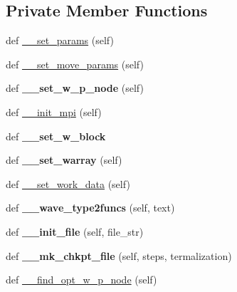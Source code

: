 \subsection*{Private Member Functions}
\begin{DoxyCompactItemize}
\item 
def \hyperlink{classMontePython_1_1MontePython_abb0b8bcdbf58fa657c24052f045241e0}{\+\_\+\+\_\+set\+\_\+params} (self)
\item 
def \hyperlink{classMontePython_1_1MontePython_ae75ee5aa95caacffb3c22a64346f93d8}{\+\_\+\+\_\+set\+\_\+move\+\_\+params} (self)
\item 
\hypertarget{classMontePython_1_1MontePython_a744df5118714b5f3c7045f3c3b006b64}{}def {\bfseries \+\_\+\+\_\+set\+\_\+w\+\_\+p\+\_\+node} (self)\label{classMontePython_1_1MontePython_a744df5118714b5f3c7045f3c3b006b64}

\item 
def \hyperlink{classMontePython_1_1MontePython_a0138e484a9562de2681bf405b6b116b2}{\+\_\+\+\_\+init\+\_\+mpi} (self)
\item 
\hypertarget{classMontePython_1_1MontePython_aac273222b8e9e6267d656dccc78c1423}{}def {\bfseries \+\_\+\+\_\+set\+\_\+w\+\_\+block}\label{classMontePython_1_1MontePython_aac273222b8e9e6267d656dccc78c1423}

\item 
\hypertarget{classMontePython_1_1MontePython_a513762297492e12bcfa0d35c62ee080a}{}def {\bfseries \+\_\+\+\_\+set\+\_\+warray} (self)\label{classMontePython_1_1MontePython_a513762297492e12bcfa0d35c62ee080a}

\item 
def \hyperlink{classMontePython_1_1MontePython_ae1bd1bcab91678638894f3a2630b9ed1}{\+\_\+\+\_\+set\+\_\+work\+\_\+data} (self)
\item 
\hypertarget{classMontePython_1_1MontePython_aa3b29cc6ffadd601aa9a85ca43cdbd21}{}def {\bfseries \+\_\+\+\_\+wave\+\_\+type2funcs} (self, text)\label{classMontePython_1_1MontePython_aa3b29cc6ffadd601aa9a85ca43cdbd21}

\item 
\hypertarget{classMontePython_1_1MontePython_a8c248bc034dc8baafe8d4bee375e1959}{}def {\bfseries \+\_\+\+\_\+init\+\_\+file} (self, file\+\_\+str)\label{classMontePython_1_1MontePython_a8c248bc034dc8baafe8d4bee375e1959}

\item 
\hypertarget{classMontePython_1_1MontePython_a6cda1571aeb6967947a57fbad8fef8fd}{}def {\bfseries \+\_\+\+\_\+mk\+\_\+chkpt\+\_\+file} (self, steps, termalization)\label{classMontePython_1_1MontePython_a6cda1571aeb6967947a57fbad8fef8fd}

\item 
def \hyperlink{classMontePython_1_1MontePython_aae3184cc85613e6ef53c2cc1e4317c6e}{\+\_\+\+\_\+find\+\_\+opt\+\_\+w\+\_\+p\+\_\+node} (self)
\end{DoxyCompactItemize}


